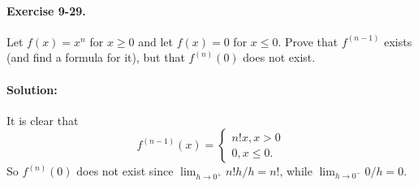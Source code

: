\documentclass{article}
\begin{document}
\paragraph{Exercise 9-29.} Let $f(x) = x^n$ for $x \geq 0$ and let $f(x) = 0$
for $x \leq 0$. Prove that $f^{(n-1)}$ exists (and find a formula for it), but
that $f^(n)(0)$ does not exist.

\paragraph{Solution:} It is clear that \begin{equation*}
  f^{(n-1)}(x) = \begin{cases}
    n!x, x > 0 \\
    0, x \leq 0.
  \end{cases}
\end{equation*}
So $f^{(n)}(0)$ does not exist since $\lim_{h \rightarrow 0^+}n!h/h = n!$,
while $\lim_{h \rightarrow 0^-}0/h = 0$.
\end{document}
